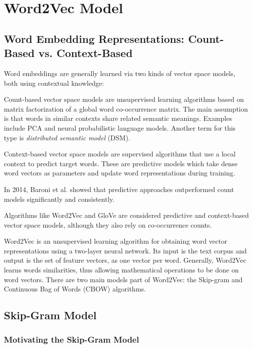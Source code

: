\section{Word2Vec Model}

\subsection{Word Embedding Representations: Count-Based vs. Context-Based}
 
Word embeddings are generally learned via two kinds of vector space models, both using contextual knowledge: 

Count-based vector space models are unsupervised learning algorithms based on matrix factorization of a global word co-occurrence matrix. The main assumption is that words in similar contexts share related semantic meanings. Examples include PCA and neural probabilistic language models. Another term for this type is \emph{distributed semantic model} (DSM).

Context-based vector space models are supervised algorithms that use a local context to predict target words. These are predictive models which take dense word vectors as parameters and update word representations during training.

In 2014, Baroni et al. showed that predictive approaches outperformed count models significantly and consistently. 

Algorithms like Word2Vec and GloVe are considered predictive and context-based vector space models, although they also rely on co-occurrence counts. 

Word2Vec is an unsupervised learning algorithm for obtaining word vector representations using a two-layer neural network. Its input is the text corpus and output is the set of feature vectors, as one vector per word. Generally, Word2Vec learns words similarities, thus allowing mathematical operations to be done on word vectors. There are two main models part of Word2Vec: the Skip-gram and Continuous Bag of Words (CBOW) algorithms. 

\subsection{Skip-Gram Model}

\subsubsection{Motivating the Skip-Gram Model}

